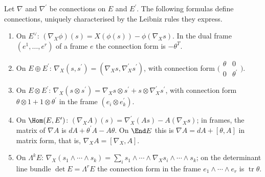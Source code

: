 \begin{proposition}\label{connections:proposition-induced-connections}
Let $\nabla$ and $\nabla^{\prime}$ be connections on $E$ and $E^{\prime}$. The following formulas define connections, uniquely characterised by the Leibniz rules they express.
\begin{enumerate}
\item On $E^\vee$: $(\nabla_X\phi)(s) = X(\phi(s)) - \phi(\nabla_Xs)$. In the dual frame $(e^1, \ldots, e^r)$ of a frame $e$ the connection form is $-\theta^T$.
\item On $E \oplus E^{\prime}$: $\nabla_X(s, s^{\prime}) = (\nabla_Xs, \nabla^{\prime}_Xs^{\prime})$, with connection form $\bigl(\begin{smallmatrix}\theta & 0\\ 0 & \theta^{\prime}\end{smallmatrix}\bigr)$.
\item On $E \otimes E^{\prime}$: $\nabla_X(s \otimes s^{\prime}) = \nabla_Xs \otimes s^{\prime} + s \otimes \nabla^{\prime}_Xs^{\prime}$, with connection form $\theta \otimes 1 + 1 \otimes \theta^{\prime}$
in the frame $(e_i \otimes e^{\prime}_k)$.
\item On $\Hom(E, E^{\prime})$: $(\nabla_XA)(s) = \nabla^{\prime}_X(As) - A(\nabla_Xs)$; in frames, the matrix of $\nabla A$ is $dA + \theta^{\prime}A - A\theta$. On $\End E$ this is
$\nabla A = dA + [\theta, A]$ in matrix form, that is, $\nabla_XA = [\nabla_X, A]$.
\item On $\Lambda^kE$: $\nabla_X(s_1 \wedge \cdots \wedge s_k) = \sum_is_1 \wedge \cdots \wedge \nabla_Xs_i \wedge \cdots \wedge s_k$; on the determinant line bundle $\det E = \Lambda^rE$ the
connection form in the frame $e_1 \wedge \cdots \wedge e_r$ is $\operatorname{tr}\theta$.
\end{enumerate}
\end{proposition}

